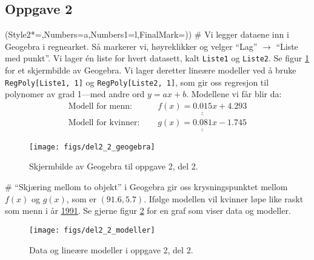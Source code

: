 \documentclass[12pt, a4paper]
{article}						%
\def\answer#1{\underline{\underline{#1}}}
\begin{document}
\subsection*{Oppgave 2}
\begin{easylist}[enumerate]
	\ListProperties(Style2*=,Numbers=a,Numbers1=l,FinalMark={)})
	# Vi legger dataene inn i Geogebra i regnearket. Så markerer vi, høyreklikker og velger ``Lag'' $\rightarrow$ ``Liste med punkt''. Vi lager én liste for hvert datasett, kalt \texttt{Liste1} og \texttt{Liste2}. Se figur \ref{fig:del22geogebra} for et skjermbilde av Geogebra.
	Vi lager deretter lineære modeller ved å bruke  \texttt{RegPoly[Liste1, 1]} og \texttt{RegPoly[Liste2, 1]}, som gir oss regresjon til polynomer av grad 1---med andre ord $y = ax+b$.
	Modellene vi får blir da:
	\begin{align*}
		\text{Modell for menn: }& \quad  \answer{f(x) = 0.015x + 4.293} \\
		\text{Modell for kvinner: }& \quad  \answer{g(x) = 0.081x - 1.745}
	\end{align*}
	
	\begin{figure}[th!]
		\centering
		\texttt{[image: figs/del2\_2\_geogebra]}
		\caption{Skjermbilde av Geogebra til oppgave 2, del 2.}
		\label{fig:del22geogebra}
	\end{figure}
	
	
	# ``Skjæring mellom to objekt'' i Geogebra gir oss krysningspunktet mellom $f(x)$ og $g(x)$, som er $(91.6, 5.7)$.
	Ifølge modellen vil kvinner løpe like raskt som menn i år \answer{1991}.
	Se gjerne figur \ref{fig:del22modeller} for en graf som viser data og modeller.
	
	
	\begin{figure}[th!]
		\centering
		\texttt{[image: figs/del2\_2\_modeller]}
		\caption{Data og lineære modeller i oppgave 2, del 2.}
		\label{fig:del22modeller}
	\end{figure}
	

\end{easylist}
\end{document}
